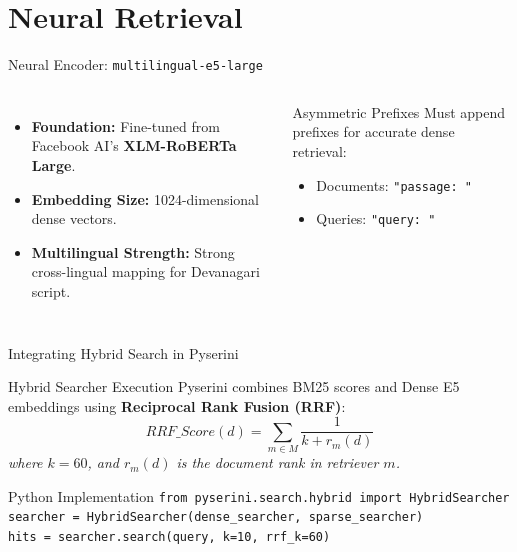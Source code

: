 \documentclass[aspectratio=169]{beamer}
\begin{document}
\section{Neural Retrieval}
\begin{frame}{Neural Encoder: \texttt{multilingual-e5-large}}
  \begin{columns}
    \begin{itemize}
      \item \textbf{Foundation:} Fine-tuned from Facebook AI's \textbf{XLM-RoBERTa Large}.
      \item \textbf{Embedding Size:} 1024-dimensional dense vectors.
      \item \textbf{Multilingual Strength:} Strong cross-lingual mapping for Devanagari script.
    \end{itemize}
    
    \begin{alertblock}{Asymmetric Prefixes}
      Must append prefixes for accurate dense retrieval:
      \begin{itemize}
        \item Documents: \texttt{"passage: "}
        \item Queries: \texttt{"query: "}
      \end{itemize}
    \end{alertblock}
  \end{columns}
\end{frame}

\begin{frame}{Integrating Hybrid Search in Pyserini}
  \begin{block}{Hybrid Searcher Execution}
    Pyserini combines BM25 scores and Dense E5 embeddings using \textbf{Reciprocal Rank Fusion (RRF)}:
    $$RRF\_Score(d) = \sum_{m \in M} \frac{1}{k + r_m(d)}$$
    \textit{where $k=60$, and $r_m(d)$ is the document rank in retriever $m$.}
  \end{block}
  \vspace{0.3cm}
  \begin{exampleblock}{Python Implementation}
    \texttt{from pyserini.search.hybrid import HybridSearcher}\\
    \texttt{searcher = HybridSearcher(dense\_searcher, sparse\_searcher)}\\
    \texttt{hits = searcher.search(query, k=10, rrf\_k=60)}
  \end{exampleblock}
\end{frame}
\end{document}
